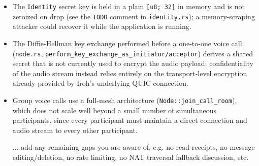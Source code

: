 \begin{itemize}
    \item The \texttt{Identity} secret key is held in a plain
    \texttt{[u8; 32]} in memory and is not zeroized on drop (see the
    \texttt{TODO} comment in \texttt{identity.rs}); a memory-scraping
    attacker could recover it while the application is running.
    \item The Diffie-Hellman key exchange performed before a
    one-to-one voice call (\texttt{node.rs},
    \texttt{perform\_key\_exchange\_as\_initiator/acceptor}) derives a
    shared secret that is not currently used to encrypt the audio
    payload; confidentiality of the audio stream instead relies
    entirely on the transport-level encryption already provided by
    Iroh's underlying QUIC connection.
    \item Group voice calls use a full-mesh architecture
    (\texttt{Node::join\_call\_room}), which does not scale well beyond
    a small number of simultaneous participants, since every
    participant must maintain a direct connection and audio stream to
    every other participant.
    \item [... add any remaining gaps you are aware of, e.g. no
    read-receipts, no message editing/deletion, no rate limiting,
    no NAT traversal fallback discussion, etc.]
\end{itemize}

\fi


